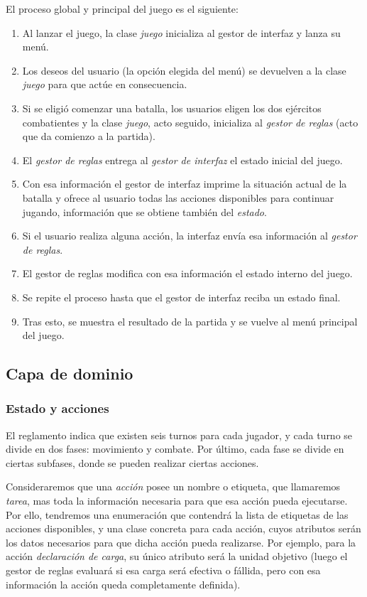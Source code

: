 El proceso global y principal del juego es el siguiente:

\begin{enumerate}
\item Al lanzar el juego, la clase \emph{juego} inicializa al gestor
  de interfaz y lanza su menú.
\item Los deseos del usuario (la opción elegida del menú) se devuelven
  a la clase \emph{juego} para que actúe en consecuencia.
\item Si se eligió comenzar una batalla, los usuarios eligen los
  dos ejércitos combatientes y la clase \emph{juego}, acto seguido,
  inicializa al \emph{gestor de reglas} (acto que da comienzo a la
  partida).
\item El \emph{gestor de reglas} entrega al \emph{gestor de interfaz}
  el estado inicial del juego.
\item Con esa información el gestor de interfaz imprime
la situación actual de la batalla y ofrece al usuario todas las
acciones disponibles para continuar jugando, información que se
obtiene también del \emph{estado}.
\item Si el usuario realiza alguna acción, la interfaz envía esa
  información al \emph{gestor de reglas}.
\item El gestor de reglas modifica con esa información
  el estado interno del juego.
\item Se repite el proceso hasta que el gestor de interfaz
  reciba un estado final.
\item Tras esto, se muestra el resultado de la partida y se vuelve al
  menú principal del juego.
\end{enumerate}

\subsection{Capa de dominio}
\subsubsection{Estado y acciones}
El reglamento indica que existen seis turnos para cada jugador, y
cada turno se divide en dos fases: movimiento y combate. Por último,
cada fase se divide en ciertas subfases, donde se pueden realizar
ciertas acciones.

Consideraremos que una \emph{acción} posee un nombre o etiqueta, que
llamaremos \emph{tarea}, mas toda la información necesaria para que esa
acción pueda ejecutarse. Por ello, tendremos una enumeración que
contendrá la lista de etiquetas de las acciones disponibles, y una
clase concreta para cada acción, cuyos atributos serán los datos
necesarios para que dicha acción pueda realizarse. Por ejemplo, para
la acción \emph{declaración de carga}, su único atributo será la
unidad objetivo (luego el gestor de reglas evaluará si esa carga será
efectiva o fállida, pero con esa información la acción queda
completamente definida).


